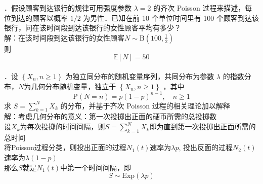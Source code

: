 \documentclass[UTF8]{ctexart}
\begin{document}
．假设顾客到达银行的规律可用强度参数 $\lambda=2$ 的齐次 Poisson 过程来描述，每位到达的顾客以概率 $1 / 2$ 为男性．已知在前 10 个单位时间里有 100 个顾客到达该银行，问在该时间段到达该银行的女性顾客平均有多少？\\
解：在该时间段到达该银行的女性顾客$N\sim \mathrm{B}\left(100,\frac{1}{2} \right) $\\
则
\[
\mathbb{E}[N]=50
\]\\




．设 $\left\{X_{n}, n \geq 1\right\}$ 为独立同分布的随机变量序列，共同分布为参数 $\lambda$ 的指数分布，$N$为几何分布随机变量，独立于 $\left\{X_{n}, n \geq 1\right\}$ ，其中
$$
\mathrm{P}(N=n)=p(1-p)^{n-1}, \quad n \geq 1
$$
求 $S=\sum\limits_{k=1}^{N} X_{k}$ 的分布，并基于齐次 Poisson 过程的相关理论加以解释\\
解：考虑几何分布的意义：第一次投掷出正面的硬币所需的总投掷数\\
设$X_k$为每次投掷的时间间隔，则$S=\sum\limits_{k=1}^N X_k$即为直到第一次投掷出正面所需的总时间\\
将Poisson过程分类，则投出正面的过程$N_1(t)$速率为$\lambda p$,
投出反面的过程$N_2(t)$速率为$\lambda (1-p)$\\
那么$S$就是$N_1(t)$中第一个时间间隔，即
\[
S \sim \mathrm{Exp}(\lambda p)
\]\\

	
\end{document}
